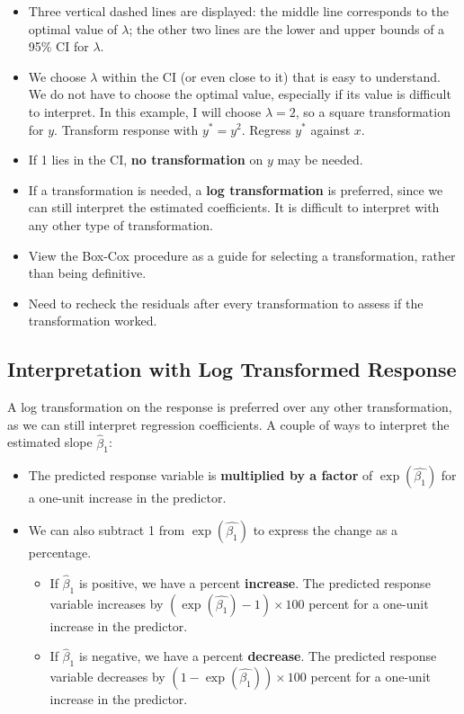 \documentclass[
]{book}
\providecommand{\tightlist}{%
  \setlength{\itemsep}{0pt}\setlength{\parskip}{0pt}}
\begin{document}
\begin{itemize}
\tightlist
\item
  Three vertical dashed lines are displayed: the middle line corresponds to the optimal value of \(\lambda\); the other two lines are the lower and upper bounds of a 95\% CI for \(\lambda\).
\item
  We choose \(\lambda\) within the CI (or even close to it) that is easy to understand. We do not have to choose the optimal value, especially if its value is difficult to interpret. In this example, I will choose \(\lambda = 2\), so a square transformation for \(y\). Transform response with \(y^* = y^2\). Regress \(y^*\) against \(x\).
\item
  If 1 lies in the CI, \textbf{no transformation} on \(y\) may be needed.
\item
  If a transformation is needed, a \textbf{log transformation} is preferred, since we can still interpret the estimated coefficients. It is difficult to interpret with any other type of transformation.
\item
  View the Box-Cox procedure as a guide for selecting a transformation, rather than being definitive.
\item
  Need to recheck the residuals after every transformation to assess if the transformation worked.
\end{itemize}

\hypertarget{interpretation-with-log-transformed-response}{%
\subsection{Interpretation with Log Transformed Response}\label{interpretation-with-log-transformed-response}}

A log transformation on the response is preferred over any other transformation, as we can still interpret regression coefficients. A couple of ways to interpret the estimated slope \(\hat{\beta}_1\):

\begin{itemize}
\tightlist
\item
  The predicted response variable is \textbf{multiplied by a factor} of \(\exp(\hat{\beta_1})\) for a one-unit increase in the predictor.
\item
  We can also subtract 1 from \(\exp(\hat{\beta_1})\) to express the change as a percentage.

  \begin{itemize}
  \tightlist
  \item
    If \(\hat{\beta}_1\) is positive, we have a percent \textbf{increase}. The predicted response variable increases by \((\exp(\hat{\beta_1}) - 1) \times 100\) percent for a one-unit increase in the predictor.
  \item
    If \(\hat{\beta}_1\) is negative, we have a percent \textbf{decrease}. The predicted response variable decreases by \((1 - \exp(\hat{\beta_1})) \times 100\) percent for a one-unit increase in the predictor.
  \end{itemize}
\end{itemize}
\end{document}
